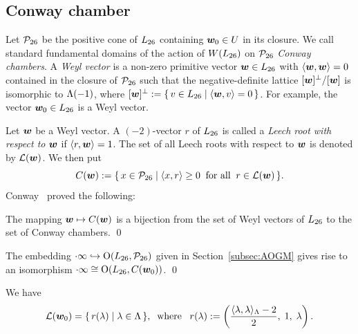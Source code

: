 \documentclass{amsart} %
\begin{document}
\subsection{Conway chamber}\label{subsec:ConwayChamber}
%
Let $\mathord{\mathcal{P}}_{26}$ be the 
positive cone of $L_{26}$ 
containing $\boldsymbol{w}_0\in U$ in its closure.
We call standard fundamental domains of the action of $W(L_{26})$ on $\mathord{\mathcal{P}}_{26}$ 
\emph{Conway chambers}.
A \emph{Weyl vector} is a non-zero primitive vector $\boldsymbol{w} \in L_{26}$
with $\langle \boldsymbol{w} , \boldsymbol{w}  \rangle=0$ contained in 
the closure of $\mathord{\mathcal{P}}_{26}$ such that
the negative-definite lattice $[\boldsymbol{w} ]^{\perp}/[\boldsymbol{w} ]$ is isomorphic to $\Lambda(-1)$,
where $[\boldsymbol{w} ]^{\perp}:=\{\,{v\in L_{26}}\mid {\langle \boldsymbol{w}, v \rangle=0} \,\}$.
For example, the vector $\boldsymbol{w}_0\in L_{26}$ is a Weyl vector.
%
\par
Let $\boldsymbol{w} $ be a Weyl vector.
A $(-2)$-vector $r$ of $L_{26}$ is called a \emph{Leech root with respect to $\boldsymbol{w} $} if $\langle r, \boldsymbol{w}  \rangle=1$.
The set of all Leech roots with respect to $\boldsymbol{w} $ is denoted by $\mathord{\mathcal{L}}(\boldsymbol{w} )$.
We then put
\[
\mathord{C}(\boldsymbol{w} ):=\{\,{x\in\mathord{\mathcal{P}}_{26}}\mid {\langle x, r \rangle\ge 0\;\;\textrm{for all}\;\; r\in \mathord{\mathcal{L}}(\boldsymbol{w})} \,\}.
\]
%
Conway~\cite{MR690711} proved the following:
%
\begin{theorem}
The mapping $\boldsymbol{w} \mapsto \mathord{C}(\boldsymbol{w})$ is a bijection from the set of Weyl vectors of $L_{26}$ to
the set of Conway chambers.
\qed
\end{theorem}
%
\begin{corollary}
The embedding $\cdot \infty\hookrightarrow \mathord{\mathrm{O}}(L_{26}, \mathord{\mathcal{P}}_{26})$ given in Section~\ref{subsec:AOGM} 
gives rise to an isomorphism 
$\cdot \infty\cong \mathord{\mathrm{O}}(L_{26}, \mathord{C}(\boldsymbol{w}_0))$.
\qed
\end{corollary}
%
We have 
\begin{equation}\label{eq:Leechrootlambda}
\mathord{\mathcal{L}}(\boldsymbol{w}_0)=\{\,{r(\lambda)}\mid {\lambda\in \Lambda} \,\},
\;\;\textrm{where}\;\;\; r(\lambda):=\left(\frac{\langle \lambda, \lambda \rangle_{\Lambda}-2}{2}, \; 1,\; \lambda\right).
\end{equation}
%
%
\end{document}
